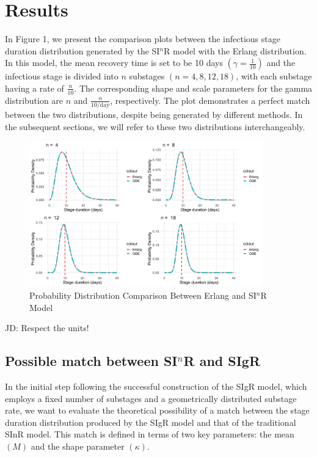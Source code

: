 \documentclass[12pt]{article}
\newcommand{\perday}{\ensuremath{\mathrm{/day}}}
\begin{document}
\section{Results}
In Figure 1, we present the comparison plots between the infectious stage duration distribution generated by the SI$^n$R model with the Erlang distribution. In this model, the mean recovery time is set to be 10 days $(\gamma = \frac{1}{10})$ and the infectious stage is divided into $n$ substages $(n = 4, 8, 12, 18)$, with each substage having a rate of $\frac{n}{10}$. The corresponding shape and scale parameters for the gamma distribution are $n$ and $\frac{n}{10\perday}$, respectively. The plot demonstrates a perfect match between the two distributions, despite being generated by different methods. In the subsequent sections, we will refer to these two distributions interchangeably.
\begin{figure}[h]
    \centering
    \includegraphics[width= 0.9\textwidth]{4.png}
    \caption{Probability Distribution Comparison Between Erlang and SI$^n$R Model}
\end{figure}
JD: Respect the units!

\subsection{Possible match between SI$^n$R and SIgR}
In the initial step following the successful construction of the SIgR model, which employs a fixed number of substages and a geometrically distributed substage rate, we want to evaluate the theoretical possibility of a match between the stage duration distribution produced by the SIgR model and that of the traditional SInR model. This match is defined in terms of two key parameters: the mean $(M)$ and the shape parameter $(\kappa)$.
\end{document}
